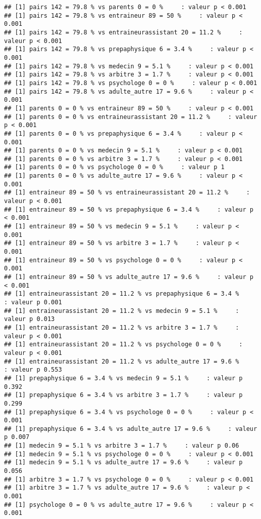 \documentclass[
]{article}
\begin{document}
\begin{verbatim}
## [1] pairs 142 = 79.8 % vs parents 0 = 0 %     : valeur p < 0.001
## [1] pairs 142 = 79.8 % vs entraineur 89 = 50 %     : valeur p < 0.001
## [1] pairs 142 = 79.8 % vs entraineurassistant 20 = 11.2 %     : valeur p < 0.001
## [1] pairs 142 = 79.8 % vs prepaphysique 6 = 3.4 %     : valeur p < 0.001
## [1] pairs 142 = 79.8 % vs medecin 9 = 5.1 %     : valeur p < 0.001
## [1] pairs 142 = 79.8 % vs arbitre 3 = 1.7 %     : valeur p < 0.001
## [1] pairs 142 = 79.8 % vs psychologe 0 = 0 %     : valeur p < 0.001
## [1] pairs 142 = 79.8 % vs adulte_autre 17 = 9.6 %     : valeur p < 0.001
## [1] parents 0 = 0 % vs entraineur 89 = 50 %     : valeur p < 0.001
## [1] parents 0 = 0 % vs entraineurassistant 20 = 11.2 %     : valeur p < 0.001
## [1] parents 0 = 0 % vs prepaphysique 6 = 3.4 %     : valeur p < 0.001
## [1] parents 0 = 0 % vs medecin 9 = 5.1 %     : valeur p < 0.001
## [1] parents 0 = 0 % vs arbitre 3 = 1.7 %     : valeur p < 0.001
## [1] parents 0 = 0 % vs psychologe 0 = 0 %     : valeur p 1
## [1] parents 0 = 0 % vs adulte_autre 17 = 9.6 %     : valeur p < 0.001
## [1] entraineur 89 = 50 % vs entraineurassistant 20 = 11.2 %     : valeur p < 0.001
## [1] entraineur 89 = 50 % vs prepaphysique 6 = 3.4 %     : valeur p < 0.001
## [1] entraineur 89 = 50 % vs medecin 9 = 5.1 %     : valeur p < 0.001
## [1] entraineur 89 = 50 % vs arbitre 3 = 1.7 %     : valeur p < 0.001
## [1] entraineur 89 = 50 % vs psychologe 0 = 0 %     : valeur p < 0.001
## [1] entraineur 89 = 50 % vs adulte_autre 17 = 9.6 %     : valeur p < 0.001
## [1] entraineurassistant 20 = 11.2 % vs prepaphysique 6 = 3.4 %     : valeur p 0.001
## [1] entraineurassistant 20 = 11.2 % vs medecin 9 = 5.1 %     : valeur p 0.013
## [1] entraineurassistant 20 = 11.2 % vs arbitre 3 = 1.7 %     : valeur p < 0.001
## [1] entraineurassistant 20 = 11.2 % vs psychologe 0 = 0 %     : valeur p < 0.001
## [1] entraineurassistant 20 = 11.2 % vs adulte_autre 17 = 9.6 %     : valeur p 0.553
## [1] prepaphysique 6 = 3.4 % vs medecin 9 = 5.1 %     : valeur p 0.392
## [1] prepaphysique 6 = 3.4 % vs arbitre 3 = 1.7 %     : valeur p 0.299
## [1] prepaphysique 6 = 3.4 % vs psychologe 0 = 0 %     : valeur p < 0.001
## [1] prepaphysique 6 = 3.4 % vs adulte_autre 17 = 9.6 %     : valeur p 0.007
## [1] medecin 9 = 5.1 % vs arbitre 3 = 1.7 %     : valeur p 0.06
## [1] medecin 9 = 5.1 % vs psychologe 0 = 0 %     : valeur p < 0.001
## [1] medecin 9 = 5.1 % vs adulte_autre 17 = 9.6 %     : valeur p 0.056
## [1] arbitre 3 = 1.7 % vs psychologe 0 = 0 %     : valeur p < 0.001
## [1] arbitre 3 = 1.7 % vs adulte_autre 17 = 9.6 %     : valeur p < 0.001
## [1] psychologe 0 = 0 % vs adulte_autre 17 = 9.6 %     : valeur p < 0.001
\end{verbatim}
\end{document}
